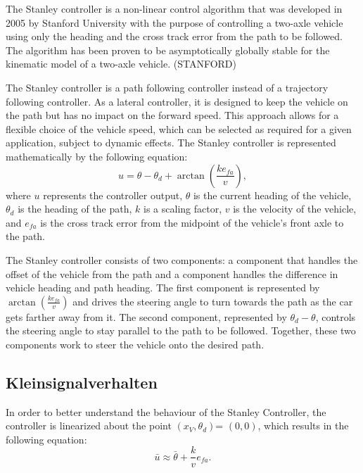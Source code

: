 \documentclass[arbeit=studie,oneside,BCOR=12mm]{ArbeitRST}
\begin{document}
\fi

The Stanley controller is a non-linear control algorithm that was developed in
2005 by Stanford University with the purpose of controlling a two-axle vehicle
using only the heading and the cross track error from the path to be followed.
The algorithm has been proven to be asymptotically globally stable for the
kinematic model of a two-axle vehicle. (STANFORD)

The Stanley controller is a path following controller instead of a trajectory
following controller. As a lateral controller, it is designed to keep the
vehicle on the path but has no impact on the forward speed. This approach
allows for a flexible choice of the vehicle speed, which can be selected as
required for a given application, subject to dynamic effects. The Stanley
controller is represented mathematically by the following equation: 
\begin{equation} 
    u = \theta - \theta_d +
    \arctan\left(\frac{ke_{fa}}{v}\right), 
    \label{eq:Stanley-Regler} 
\end{equation}
where $u$ represents the controller output, $\theta$ is the current heading of
the vehicle, $\theta_d$ is the heading of the path, $k$ is a scaling factor,
$v$ is the velocity of the vehicle, and $e_{fa}$ is the cross track error from
the midpoint of the vehicle's front axle to the path.

The Stanley controller consists of two components: a component that handles the
offset of the vehicle from the path and a component handles the difference in
vehicle heading and path heading. The first component is represented by
$\arctan(\frac{ke_{fa}}{v})$ and drives the steering angle to turn towards the
path as the car gets farther away from it. The second component, represented by
$\theta_d - \theta$, controls the steering angle to stay parallel to the path
to be followed. Together, these two components work to steer the vehicle onto
the desired path.

\subsection{Kleinsignalverhalten}

In order to better understand the behaviour of the Stanley Controller, the
controller is linearized about the point \(\left(x_V, \theta_d\right)\)=
\(\left(0, 0\right)\), which results in the following equation:
\begin{equation} 
    \bar{u} \approx \bar{\theta} + \frac{k}{v}e_{fa}.
    \label{eq:linearer Stanley-Regler} 
\end{equation}
\end{document}
